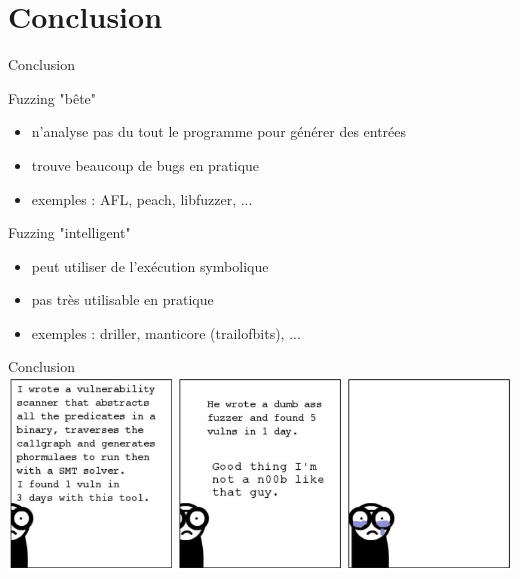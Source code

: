 \section*{Conclusion}

\begin{frame}{Conclusion}
  \begin{exampleblock}{Fuzzing "bête"}
    \begin{itemize}
      \item{ n'analyse pas du tout le programme pour générer des entrées}
      \item{trouve beaucoup de bugs en pratique}
      \item{exemples : AFL, peach, libfuzzer, ...}
    \end{itemize}
  \end{exampleblock}
  \begin{block}{Fuzzing "intelligent"}
    \begin{itemize}
      \item{peut utiliser de l'exécution symbolique}
      \item{pas très utilisable en pratique}
      \item{exemples : driller, manticore (trailofbits), ...}
    \end{itemize}
  \end{block}
\end{frame}

\begin{frame}{Conclusion}
  \includegraphics[width=\textwidth]{../medias/comics.png}
\end{frame}
